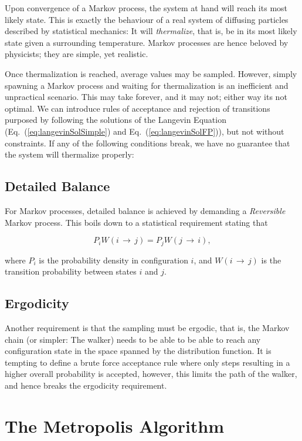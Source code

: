 Upon convergence of a Markov process, the system at hand will reach its most likely state. This is exactly the behaviour of a real system of diffusing particles described by statistical mechanics: It will \textit{thermalize}, that is, be in its most likely state given a surrounding temperature. Markov processes are hence beloved by physicists; they are simple, yet realistic. 

Once thermalization is reached, average values may be sampled. However, simply spawning a Markov process and waiting for thermalization is an inefficient and unpractical scenario. This may take forever, and it may not; either way its not optimal. We can introduce rules of acceptance and rejection of transitions purposed by following the solutions of the Langevin Equation (Eq.~(\ref{eq:langevinSolSimple}) and Eq.~(\ref{eq:langevinSolFP})), but not without constraints. If any of the following conditions break, we have no guarantee that the system will thermalize properly:

\subsection{Detailed Balance} 

For Markov processes, detailed balance is achieved by demanding a \textit{Reversible} Markov process. This boils down to a statistical requirement stating that 

\begin{equation}
 \label{eq:DetailedBalance}
 P_iW(i\,\rightarrow\,j) = P_jW(j\,\rightarrow\,i),
\end{equation}

where $P_i$ is the probability density in configuration $i$, and $W(i\,\rightarrow\,j)$ is the transition probability between states $i$ and $j$. 

\subsection{Ergodicity}

Another requirement is that the sampling must be ergodic, that is, the Markov chain (or simpler: The walker) needs to be able to be able to reach any configuration state in the space spanned by the distribution function. It is tempting to define a brute force acceptance rule where only steps resulting in a higher overall probability is accepted, however, this limits the path of the walker, and hence breaks the ergodicity requirement.

\section{The Metropolis Algorithm}
\label{sec:MetroMain}

